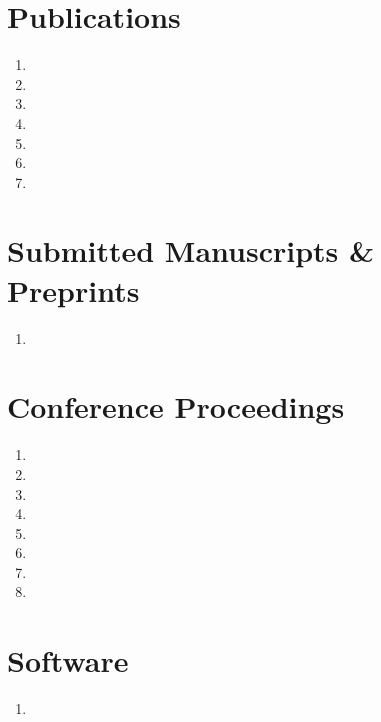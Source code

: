 \documentclass[margin,centered]{res}
\begin{document}
\begin{resume}
\section{\sc Publications}
\begin{enumerate}[leftmargin=*]
\item {}
\item {}
\item {}
\item {}
\item {}
\item {}
\item {}
\end{enumerate}

\section{\sc Submitted Manuscripts \& Preprints}

\begin{enumerate}[leftmargin=*]
\item {}
\end{enumerate}



\section{\sc Conference Proceedings}
\begin{enumerate}[leftmargin=*]
\item {}
\item {}
\item {}
\item {}
\item {}
\item {}
\item {}
\item {}
\end{enumerate}


\section{\sc Software} 
\begin{enumerate}[leftmargin=*]
\item {}


\end{enumerate}
\end{resume}
\end{document}
